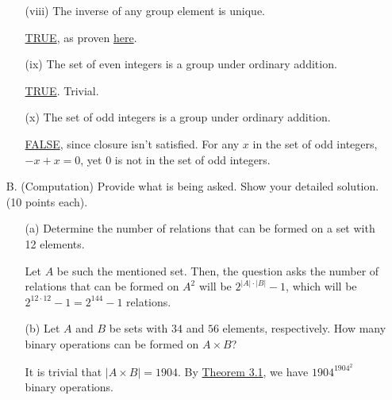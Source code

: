 \begin{enumerate}
\begin{enumerate}
        \item[(viii)] The inverse of any group element is unique.

        \underline{TRUE}, as proven \hyperref[thm:unique-inverse]{here}.

        \item[(ix)] The set of even integers is a group under ordinary addition.

        \underline{TRUE}. Trivial.

        \item[(x)] The set of odd integers is a group under ordinary addition.

        \underline{FALSE}, since closure isn't satisfied. For any \(x\) in the set of odd integers, \(-x + x = 0\), yet \(0\) is not in the set of odd integers.
    \end{enumerate}

    \item[B.] (Computation) Provide what is being asked. Show your detailed solution. (10 points each).
    \begin{enumerate}
        \item[(a)] Determine the number of relations that can be formed on a set with 12 elements.

        Let \(A\) be such the mentioned set. Then, the question asks the number of relations that can be formed on \(A^2\) will be \(2^{|A|\cdot |B|} - 1\), which will be \(2^{12\cdot 12} - 1 = 2^{144} - 1\) relations.

        \item[(b)] Let \(A\) and \(B\) be sets with \(34\) and \(56\) elements, respectively. How many binary operations can be formed on \(A \times B\)?

        It is trivial that \(|A \times B| = 1904\). By \hyperref[thm:number-of-binary-operation]{Theorem 3.1}, we have \(1904^{1904^2}\) binary operations.


\end{enumerate}
\end{enumerate}
